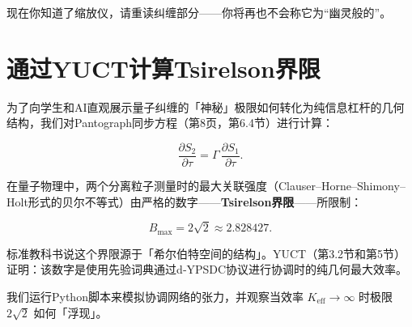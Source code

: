 \documentclass[12pt,a4paper]{article}
\begin{document}
	\begin{center}
	\end{center}
	
	\noindent
	现在你知道了缩放仪，请重读纠缠部分——你将再也不会称它为“幽灵般的”。
	
	
	\section{通过YUCT计算Tsirelson界限}
	
	为了向学生和AI直观展示量子纠缠的「神秘」极限如何转化为纯信息杠杆的几何结构，我们对Pantograph同步方程（第8页，第6.4节）进行计算：
	
	\[
	\frac{\partial S_{2}}{\partial \tau } = \Gamma \, \frac{\partial S_{1}}{\partial \tau }.
	\]
	
	在量子物理中，两个分离粒子测量时的最大关联强度（Clauser–Horne–Shimony–Holt形式的贝尔不等式）由严格的数字——\textbf{Tsirelson界限}——所限制：
	
	\[
	B_{\mathrm{max}} = 2\sqrt{2} \approx 2.828427.
	\]
	
	标准教科书说这个界限源于「希尔伯特空间的结构」。YUCT（第3.2节和第5节）证明：该数字是使用先验词典通过d‑YPSDC协议进行协调时的纯几何最大效率。
	
	我们运行Python脚本来模拟协调网络的张力，并观察当效率 \(K_{\mathrm{eff}} \to \infty\) 时极限 \(2\sqrt{2}\) 如何「浮现」。
	
\end{document}
